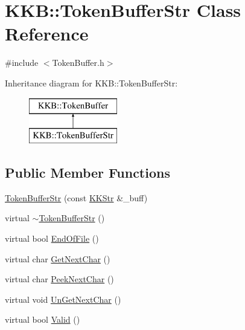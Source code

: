 \hypertarget{class_k_k_b_1_1_token_buffer_str}{}\section{K\+KB\+:\+:Token\+Buffer\+Str Class Reference}
\label{class_k_k_b_1_1_token_buffer_str}


{\ttfamily \#include $<$Token\+Buffer.\+h$>$}

Inheritance diagram for K\+KB\+:\+:Token\+Buffer\+Str\+:\begin{figure}[H]
\begin{center}
\leavevmode
\includegraphics[height=2.000000cm]{class_k_k_b_1_1_token_buffer_str}
\end{center}
\end{figure}
\subsection*{Public Member Functions}
\begin{DoxyCompactItemize}
\item 
\hyperlink{class_k_k_b_1_1_token_buffer_str_a9b4227a88ced5162235e3341fc371bf4}{Token\+Buffer\+Str} (const \hyperlink{class_k_k_b_1_1_k_k_str}{K\+K\+Str} \&\+\_\+buff)
\item 
virtual \hyperlink{class_k_k_b_1_1_token_buffer_str_ab98f32a9c78e3a903400efe46e98f982}{$\sim$\+Token\+Buffer\+Str} ()
\item 
virtual bool \hyperlink{class_k_k_b_1_1_token_buffer_str_ac15456fdd0ccaf7b8be0971c8502a6a8}{End\+Of\+File} ()
\item 
virtual char \hyperlink{class_k_k_b_1_1_token_buffer_str_a080ae7a74018196fae2c6ade68dafe94}{Get\+Next\+Char} ()
\item 
virtual char \hyperlink{class_k_k_b_1_1_token_buffer_str_acc6a7cd0b9178b4e55f22a0ebdbc6111}{Peek\+Next\+Char} ()
\item 
virtual void \hyperlink{class_k_k_b_1_1_token_buffer_str_acb375c049ac4228f665a0768a5a811ae}{Un\+Get\+Next\+Char} ()
\item 
virtual bool \hyperlink{class_k_k_b_1_1_token_buffer_str_a3f63a85db864a1e272d5da9b0c601c32}{Valid} ()
\end{DoxyCompactItemize}


